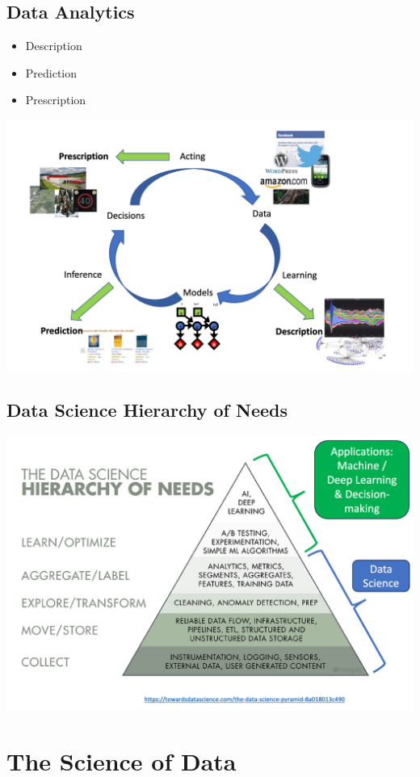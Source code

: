 \documentclass[11pt]{article}
\theoremstyle{definition}
\begin{document}
\subsection{Data Analytics}
\begin{itemize}
  \item Description
  \item Prediction
  \item Prescription
\end{itemize}
\includegraphics[width=\textwidth/2]{2.png}
\subsection{Data Science Hierarchy of Needs}
\includegraphics[width=\textwidth]{3.png}

\section{The Science of Data}
\end{document}
